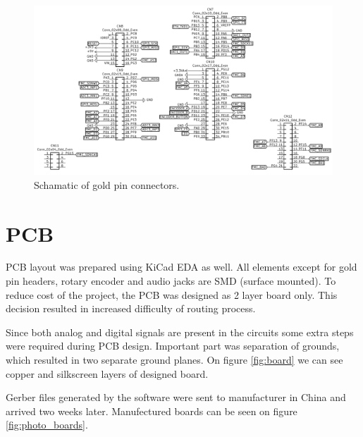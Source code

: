 \documentclass[a4paper,twoside,12pt]{book}
\begin{document}
\begin{figure}[H]
    \centering
    \includegraphics[width=\textwidth]{images/Schematic_connectors}
    \caption{Schamatic of gold pin connectors.}
    \label{fig:Schematic3}
\end{figure}

\section{PCB}
PCB layout was prepared using KiCad EDA as well.
All elements except for gold pin headers,
rotary encoder and audio jacks are SMD (surface mounted).
To reduce cost of the project, the PCB was designed as 2 layer board only.
This decision resulted in increased difficulty of routing process.

Since both analog and digital signals are present in the circuits
some extra steps were required during PCB design.
Important part was separation of grounds,
which resulted in two separate ground planes.
On figure \ref{fig:board} we can see copper and 
silkscreen layers of designed board.

Gerber files generated by the software were sent to manufacturer in China
and arrived two weeks later.
Manufectured boards can be seen on figure \ref{fig:photo_boards}.
\end{document}
